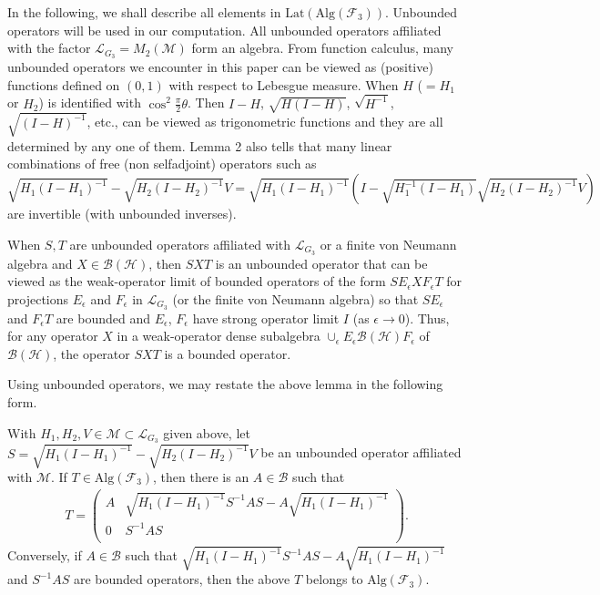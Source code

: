 \documentclass{pnastwo}
\newcommand{\B}{\mathcal B}
\newcommand{\F}{\mathcal F}
\newcommand{\HHH}{\mathcal H} %
\newcommand{\LLL}{\mathcal L} %
\newcommand{\M}{\mathcal M}
\newcommand{\Lat}{\mathrm{Lat}}
\newcommand{\Alg}{\mathrm{Alg}}
\begin{document}
\begin{article}
In the following, we shall describe all elements in
$\Lat(\Alg(\F_3))$. Unbounded operators will be used in our
computation. All unbounded operators affiliated with the factor
$\LLL_{G_3}=M_2(\M)$ form an algebra. From function calculus, many
unbounded operators we encounter in this paper can be viewed as
(positive) functions defined on $(0,1)$ with respect to Lebesgue
measure. When $H$ ($=H_1$ or $H_2$) is identified with
$\cos^2\frac{\pi}2\theta$. Then $I-H$, $\sqrt{H(I-H)}$,
$\sqrt{H^{-1}}$, $\sqrt{(I-H)^{-1}}$, etc., can be viewed as
trigonometric functions and they are all determined by any one of
them. Lemma 2 also tells that many linear combinations of free
(non selfadjoint) operators such as $\sqrt{H_{1}(I-H_{1})^{-1}} -
\sqrt{H_{2}(I-H_{2})^{-1}}V=\sqrt{H_{1}(I-H_{1})^{-1}}
(I-\sqrt{H_{1}^{-1}(I-H_{1})}\sqrt{H_{2}(I-H_{2})^{-1}}V) $ are
invertible (with unbounded inverses).

When $S, T$ are unbounded operators affiliated with $\LLL_{G_3}$ or a
finite von Neumann algebra and $X\in\B(\HHH)$, then $SXT$ is an
unbounded operator that can be viewed as the weak-operator limit of
bounded operators of the form $SE_\epsilon XF_\epsilon T$ for
projections $E_\epsilon$ and $F_\epsilon$ in $\LLL_{G_3}$ (or the
finite von Neumann algebra) so that $SE_\epsilon$ and $F_\epsilon T$
are bounded and $E_\epsilon$, $F_\epsilon$ have strong operator
limit $I$ (as $\epsilon\to 0$). Thus, for any operator $X$ in a
weak-operator dense subalgebra $\cup_\epsilon E_\epsilon \B(\HHH)
F_\epsilon$ of $\B(\HHH)$, the operator $SXT$ is a bounded operator.

Using unbounded operators, we may restate the above lemma in the
following form.

\begin{lemma}
With $H_1,H_2,
V\in\M\subset\LLL_{G_3}$ given above, let $S=
\sqrt{H_{1}(I-H_{1})^{-1}} - \sqrt{H_{2}(I-H_{2})^{-1}}V$ be an
unbounded operator affiliated with $\M$. If $ T\in\Alg(\F_3)$,
then there is an $A \in \B$ such that
\begin{align*}
T =\left(
     \begin{array}{cc}
     A   & \sqrt{H_{1}(I-H_{1})^{-1}}S^{-1}AS - A\sqrt{H_{1}(I-H_{1})^{-1}} \\
     0   & S^{-1}AS \\
     \end{array}
   \right) \mbox{.}
\end{align*}
Conversely, if $A\in\B$ such that $\sqrt{H_{1}(I-H_{1})^{-1}}S^{-1}AS- A\sqrt{H_{1}(I-H_{1})^{-1}}$
and $S^{-1}AS$ are bounded operators, then the above $T$ belongs to $\Alg(\F_3)$.
\end{lemma}


\end{article}
\end{document}
